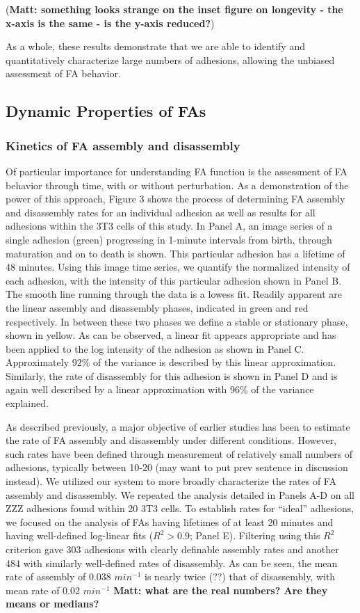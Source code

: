 \documentclass[10pt]{article}
\begin{document}
(\textbf{Matt: something looks strange on the inset figure on longevity - the x-axis is the same - is the y-axis reduced?})

As a whole, these results demonstrate that we are able to identify and quantitatively characterize large numbers of adhesions, allowing the unbiased assessment of FA behavior.



\subsection*{Dynamic Properties of FAs}
\subsubsection*{Kinetics of FA assembly and disassembly}
Of particular importance for understanding FA function is the assessment of FA behavior through time, with or without perturbation. As a demonstration of the power of this approach, Figure 3 shows the process of determining FA assembly and disassembly rates for an individual adhesion as well as results for all adhesions within the 3T3 cells of this study. In Panel A, an image series of a single adhesion (green) progressing in 1-minute intervals from birth, through maturation and on to death is shown. This particular adhesion has a lifetime of 48 minutes. Using this image time series, we quantify the normalized intensity of each adhesion, with the intensity of this particular adhesion shown in Panel B. The smooth line running through the data is a lowess fit. Readily apparent are the linear assembly and disassembly phases, indicated in green and red respectively. In between these two phases we define a stable or stationary phase, shown in yellow. As can be observed, a linear fit appears appropriate and has been applied to the log intensity of the adhesion as shown in Panel C. Approximately 92\% of the variance is described by this linear approximation. Similarly, the rate of disassembly for this adhesion is shown in Panel D and is again well described by a linear approximation with 96\% of the variance explained.

As described previously, a major objective of earlier studies has been to estimate the rate of FA assembly and disassembly under different conditions. However, such rates have been defined through measurement of relatively small numbers of adhesions, typically between 10-20 (may want to put prev sentence in discussion instead). We utilized our system to more broadly characterize the rates of FA assembly and disassembly. We repeated the analysis detailed in Panels A-D on all ZZZ adhesions found within 20 3T3 cells. To establish rates for ``ideal'' adhesions, we focused on the analysis of FAs having lifetimes of at least 20 minutes and having well-defined log-linear fits ($R^2 > 0.9$; Panel E). Filtering using this $R^2$ criterion gave 303 adhesions with clearly definable assembly rates and another 484 with similarly well-defined rates of disassembly. As can be seen, the mean rate of assembly of 0.038 $min^{-1}$ is nearly twice (??) that of disassembly, with mean rate of 0.02 $min^{-1}$ \textbf{Matt: what are the real numbers? Are they means or medians?} 
\end{document}
